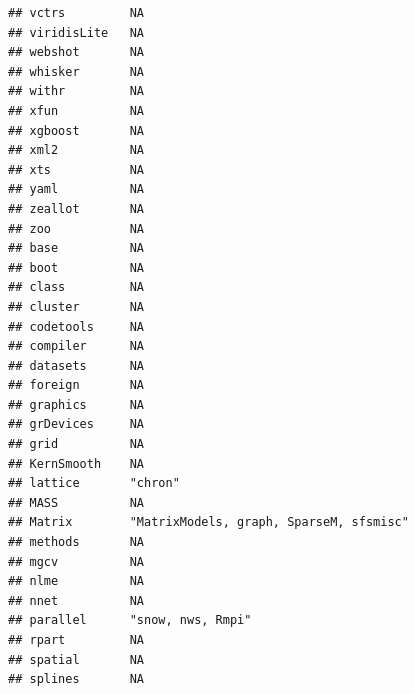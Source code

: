 \documentclass[]{article}
\begin{document}
\begin{verbatim}
## vctrs         NA                                                        
## viridisLite   NA                                                        
## webshot       NA                                                        
## whisker       NA                                                        
## withr         NA                                                        
## xfun          NA                                                        
## xgboost       NA                                                        
## xml2          NA                                                        
## xts           NA                                                        
## yaml          NA                                                        
## zeallot       NA                                                        
## zoo           NA                                                        
## base          NA                                                        
## boot          NA                                                        
## class         NA                                                        
## cluster       NA                                                        
## codetools     NA                                                        
## compiler      NA                                                        
## datasets      NA                                                        
## foreign       NA                                                        
## graphics      NA                                                        
## grDevices     NA                                                        
## grid          NA                                                        
## KernSmooth    NA                                                        
## lattice       "chron"                                                   
## MASS          NA                                                        
## Matrix        "MatrixModels, graph, SparseM, sfsmisc"                   
## methods       NA                                                        
## mgcv          NA                                                        
## nlme          NA                                                        
## nnet          NA                                                        
## parallel      "snow, nws, Rmpi"                                         
## rpart         NA                                                        
## spatial       NA                                                        
## splines       NA                                                        

\end{verbatim}
\end{document}
